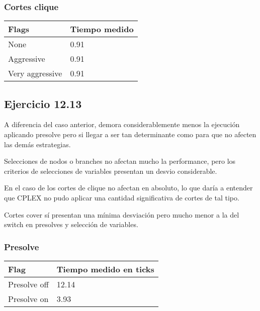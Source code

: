 \subsubsection{Cortes clique}

    \begin{center}
        \begin{tabular}{ | m{7em} | m{5cm} | }
        \hline
        Flags  & Tiempo medido \\
        \hline
        None  & 0.91 \\
        \hline
        Aggressive  & 0.91 \\
        \hline
        Very aggressive  & 0.91 \\
        \hline
        \end{tabular}
    \end{center}


\subsection{Ejercicio 12.13}
A diferencia del caso anterior, demora considerablemente menos la ejecución aplicando presolve pero si llegar a ser tan determinante como para que no afecten las demás estrategias.

Selecciones de nodos o branches no afectan mucho la performance, pero los criterios de selecciones de variables presentan un desvio considerable.

En el caso de los cortes de clique no afectan en absoluto, lo que daría a entender que CPLEX no pudo aplicar una cantidad significativa de cortes de tal tipo.

Cortes cover sí presentan una mínima desviación pero mucho menor a la del switch en presolves y selección de variables.

\subsubsection{Presolve}

    \begin{center}
        \begin{tabular}{ | m{7em} | m{5cm} | }
        \hline
        Flag & Tiempo medido en ticks \\
        \hline
        Presolve off & 12.14 \\
        \hline
        Presolve on & 3.93 \\
        \hline
        \end{tabular}
    \end{center}

